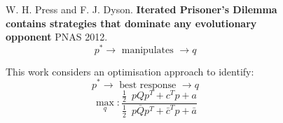 \documentclass[usenames,dvipsnames,t]{beamer}
\begin{document}
\begin{columns}
    \begin{column}{.05\linewidth}
    \end{column}
    \begin{column}{.2\linewidth}
        \vspace{3cm}

        
    \end{column}
    \begin{column}{.3\linewidth}
    \vspace{-.5cm}
        \begin{center}
             \\
             \\
            
        \end{center}
    \end{column}
    \begin{column}{.1\linewidth}
        \vspace{2cm}

        
    \end{column}
    \begin{column}{.3\linewidth}
        \vspace{1cm}

        \small{
            W. H. Press and F. J. Dyson. \textbf{Iterated Prisoner’s
            Dilemma contains strategies that dominate any evolutionary opponent}
            PNAS 2012.%
            \[p ^ * \rightarrow \text{ manipulates } \rightarrow q\]
        }
        \vspace{1cm}

        \small{
        This work considers an optimisation approach to identify:
        \[ p ^ * \rightarrow \text{ best response } \rightarrow q\]}
        \normalsize{\textcolor{solarizedGreen}{
         \[\max_q: \frac{\frac{1}{2}\enspace p  Q  p^T + c^T p + a}
                  {\frac{1}{2}\enspace  p  \bar{Q}  p^T + \bar{c}^T  p + \bar{a}}\]
            }}
    \end{column}
    \begin{column}{.05\linewidth}
    \end{column}
\end{columns}
\vspace{1cm}
\end{document}
